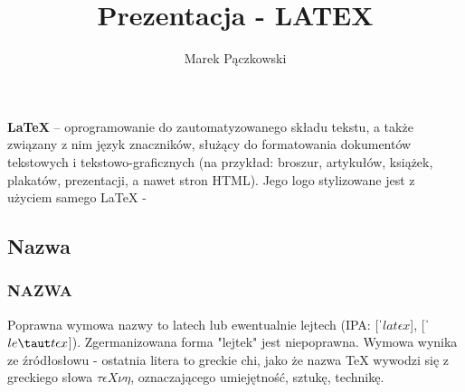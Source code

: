 \documentclass[serif]{beamer}
\date{}
\title{Prezentacja - LATEX}
\author{Marek Pączkowski}
\begin{document}
\section{}

\begin{frame}
	
	\begin{center}
	\titlepage
	\end{center}

\end{frame}

\begin{frame}

\textbf{ LaTeX} – oprogramowanie do zautomatyzowanego składu tekstu, a także związany z nim język znaczników, służący do formatowania dokumentów tekstowych i tekstowo-graficznych (na przykład: broszur, artykułów, książek, plakatów, prezentacji, a nawet stron HTML). Jego logo stylizowane jest z użyciem samego LaTeX -  {\displaystyle {} } 
\end{frame}

\begin{frame}





\tableofcontents



\end{frame}

\begin{frame}
 \section{Nazwa}
\frametitle{NAZWA}
Poprawna wymowa nazwy to latech lub ewentualnie lejtech (IPA: [ˈ$lat \epsilon x$], [ˈ$le \taut t \epsilon x$]). Zgermanizowana forma "lejtek" jest niepoprawna. Wymowa wynika ze źródłosłowu - ostatnia litera to greckie chi, jako że nazwa TeX wywodzi się z greckiego słowa $\tau\epsilon X \nu\eta$, oznaczającego umiejętność, sztukę, technikę.

\end{frame}
\end{document}
